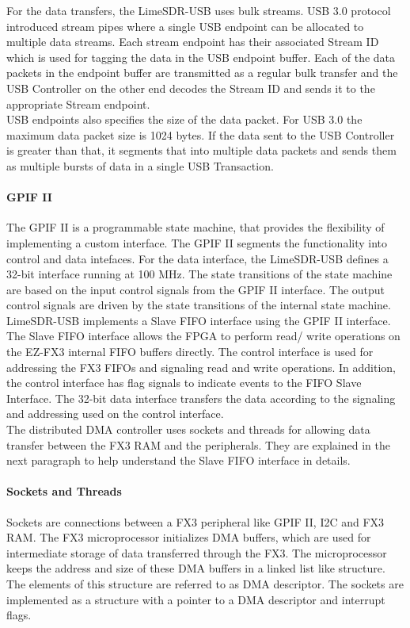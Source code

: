 For the data transfers, the LimeSDR-USB uses bulk streams.
USB 3.0 protocol introduced stream pipes where a single \ac{USB} endpoint can be allocated to multiple data streams.
Each stream endpoint has their associated Stream ID which is used for tagging the data in the USB endpoint buffer.
Each of the data packets in the endpoint buffer are transmitted as a regular bulk transfer and the USB Controller on the other end decodes the Stream ID and sends it to the appropriate Stream endpoint. \\

USB endpoints also specifies the size of the data packet.
For USB 3.0 the maximum data packet size is 1024 bytes.
If the data sent to the USB Controller is greater than that, it segments that into multiple data packets and sends them as multiple bursts of data in a single USB Transaction. 
 
\paragraph{GPIF II}
The \ac{GPIF} II is a programmable state machine, that provides the flexibility of implementing a custom interface.
The GPIF II segments the functionality into control and data intefaces.
For the data interface, the LimeSDR-USB defines a 32-bit interface running at 100 MHz.
The state transitions of the state machine are based on the input control signals from the GPIF II interface.
The output control signals are driven by the state transitions of the internal state machine.\\

LimeSDR-USB implements a Slave FIFO interface using the \ac{GPIF} II interface.
The Slave FIFO interface allows the \ac{FPGA} to perform read/ write operations on the EZ-FX3 internal FIFO buffers directly.
The control interface is used for addressing the FX3 FIFOs and signaling read and write operations.
In addition, the control interface has flag signals to indicate events to the FIFO Slave Interface.
The 32-bit data interface transfers the data according to the signaling and addressing used on the control interface.\\

The distributed \ac{DMA} controller uses sockets and threads for allowing data transfer between the FX3 RAM and the peripherals.
They are explained in the next paragraph to help understand the Slave FIFO interface in details.

\paragraph{Sockets and Threads}
Sockets are connections between a FX3 peripheral like GPIF II, I2C and FX3 RAM. 
The FX3 microprocessor initializes \ac{DMA} buffers, which are used for intermediate storage of data transferred through the FX3.
The microprocessor keeps the address and size of these \ac{DMA} buffers in a linked list like structure.
The elements of this structure are referred to as \ac{DMA} descriptor.
The sockets are implemented as a structure with a pointer to a \ac{DMA} descriptor and interrupt flags.\\ 

